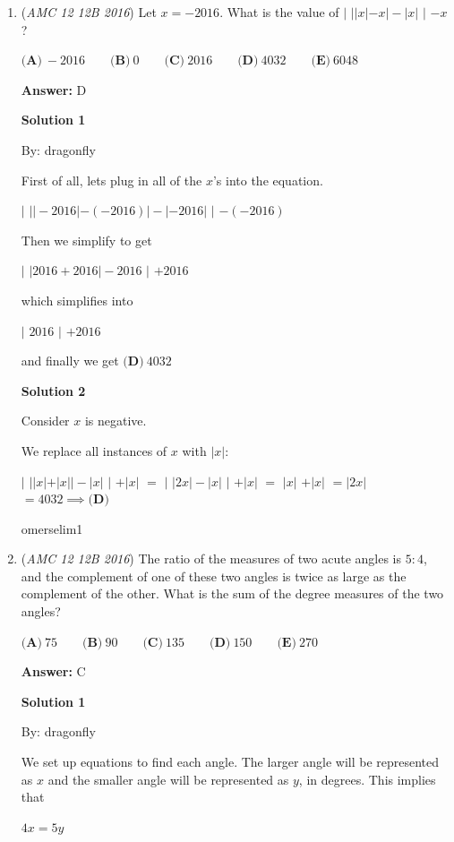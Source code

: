 \begin{enumerate}
	\item (\textit{AMC 12 12B 2016}) Let $x=-2016$. What is the value of $\bigg|$ $||x|-x|-|x|$ $\bigg|$ $-x$?


 $\textbf{(A)}\ -2016\qquad\textbf{(B)}\ 0\qquad\textbf{(C)}\ 2016\qquad\textbf{(D)}\ 4032\qquad\textbf{(E)}\ 6048$

 \textbf{Answer: }D



\textbf{Solution 1}

By: dragonfly

 First of all, lets plug in all of the $x$'s into the equation.

 $\bigg|$ $||-2016|-(-2016)|-|-2016|$ $\bigg|$ $-(-2016)$

 Then we simplify to get

 $\bigg|$ $|2016+2016|-2016$ $\bigg|$ $+2016$

 which simplifies into

 $\bigg|$ $2016$ $\bigg|$ $+2016$

 and finally we get $\boxed{\textbf{(D)}\ 4032}$




\textbf{Solution 2}

Consider $x$ is negative.

 We replace all instances of $x$ with $|x|$:

 $\bigg|$ $||x|+|x||-|x|$ $\bigg|$ $+|x|$
$=$ $\bigg|$ $|2x|-|x|$ $\bigg|$ $+|x|$
$=$ $|x|$ $+|x|$
$=|2x|$
$=4032 \implies \boxed{\textbf{(D)}}$

 omerselim1

 


	\item (\textit{AMC 12 12B 2016}) The ratio of the measures of two acute angles is $5:4$, and the complement of one of these two angles is twice as large as the complement of the other. What is the sum of the degree measures of the two angles?


 $\textbf{(A)}\ 75\qquad\textbf{(B)}\ 90\qquad\textbf{(C)}\ 135\qquad\textbf{(D)}\ 150\qquad\textbf{(E)}\ 270$

 \textbf{Answer: }C



\textbf{Solution 1}

By: dragonfly

 We set up equations to find each angle. The larger angle will be represented as $x$ and the smaller angle will be represented as $y$, in degrees. This implies that 

 $4x=5y$


\end{enumerate}
